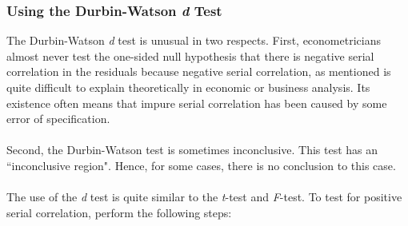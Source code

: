\documentclass[11pt]{article}
\begin{document}
\subsubsection{Using the Durbin-Watson \textit{d} Test}
The Durbin-Watson \textit{d} test is unusual in two respects. First, econometricians almost never test the one-sided null hypothesis that there is negative serial correlation in the residuals because negative serial correlation, as mentioned is quite difficult to explain theoretically in economic or business analysis. Its existence often means that impure serial correlation has been caused by some error of specification. \\ \\
Second, the Durbin-Watson test is sometimes inconclusive. This test has an ``inconclusive region". Hence, for some cases, there is no conclusion to this case.\\ \\
The use of the \textit{d} test is quite similar to the \textit{t}-test and \textit{F}-test. To test for positive serial correlation, perform the following steps:
\end{document}
